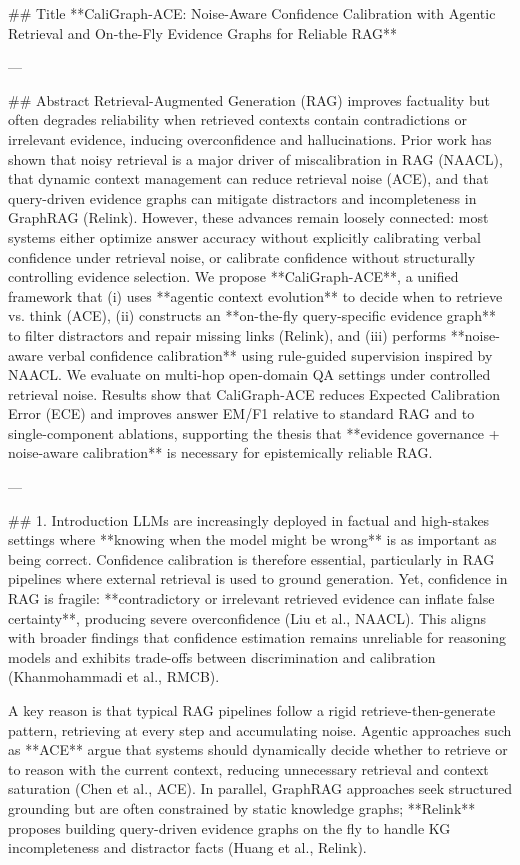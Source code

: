 ## Title  
**CaliGraph-ACE: Noise-Aware Confidence Calibration with Agentic Retrieval and On-the-Fly Evidence Graphs for Reliable RAG**

---

## Abstract  
Retrieval-Augmented Generation (RAG) improves factuality but often degrades reliability when retrieved contexts contain contradictions or irrelevant evidence, inducing overconfidence and hallucinations. Prior work has shown that noisy retrieval is a major driver of miscalibration in RAG (NAACL), that dynamic context management can reduce retrieval noise (ACE), and that query-driven evidence graphs can mitigate distractors and incompleteness in GraphRAG (Relink). However, these advances remain loosely connected: most systems either optimize answer accuracy without explicitly calibrating verbal confidence under retrieval noise, or calibrate confidence without structurally controlling evidence selection. We propose **CaliGraph-ACE**, a unified framework that (i) uses **agentic context evolution** to decide when to retrieve vs. think (ACE), (ii) constructs an **on-the-fly query-specific evidence graph** to filter distractors and repair missing links (Relink), and (iii) performs **noise-aware verbal confidence calibration** using rule-guided supervision inspired by NAACL. We evaluate on multi-hop open-domain QA settings under controlled retrieval noise. Results show that CaliGraph-ACE reduces Expected Calibration Error (ECE) and improves answer EM/F1 relative to standard RAG and to single-component ablations, supporting the thesis that **evidence governance + noise-aware calibration** is necessary for epistemically reliable RAG.

---

## 1. Introduction  
LLMs are increasingly deployed in factual and high-stakes settings where **knowing when the model might be wrong** is as important as being correct. Confidence calibration is therefore essential, particularly in RAG pipelines where external retrieval is used to ground generation. Yet, confidence in RAG is fragile: **contradictory or irrelevant retrieved evidence can inflate false certainty**, producing severe overconfidence (Liu et al., NAACL). This aligns with broader findings that confidence estimation remains unreliable for reasoning models and exhibits trade-offs between discrimination and calibration (Khanmohammadi et al., RMCB).

A key reason is that typical RAG pipelines follow a rigid retrieve-then-generate pattern, retrieving at every step and accumulating noise. Agentic approaches such as **ACE** argue that systems should dynamically decide whether to retrieve or to reason with the current context, reducing unnecessary retrieval and context saturation (Chen et al., ACE). In parallel, GraphRAG approaches seek structured grounding but are often constrained by static knowledge graphs; **Relink** proposes building query-driven evidence graphs on the fly to handle KG incompleteness and distractor facts (Huang et al., Relink).

